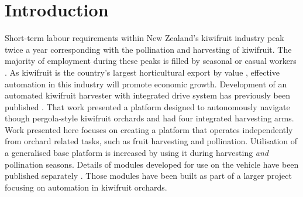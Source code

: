 \documentclass[preprint,authoryear,12pt]{elsarticle}
\begin{document}


\section{Introduction}
\label{sect:intro}
    Short-term labour requirements within New Zealand's kiwifruit industry peak twice a year corresponding with the pollination and harvesting of kiwifruit.
    The majority of employment during these peaks is filled by seasonal or casual workers \citep{Timmins2009}.
    As kiwifruit is the country's largest horticultural export by value \citep{StatisticsNewZealand2015}, effective automation in this industry will promote economic growth.
    Development of an automated kiwifruit harvester with integrated drive system has previously been published \citep{Scarfe2012}.
    That work presented a platform designed to autonomously navigate though pergola-style kiwifruit orchards and had four integrated harvesting arms.
    Work presented here focuses on creating a platform that operates independently from orchard related tasks, such as fruit harvesting and pollination.
    Utilisation of a generalised base platform is increased by using it during harvesting \emph{and} pollination seasons.
    Details of modules developed for use on the vehicle have been published separately \citep{williams2019a, williams2019b, williams2019c}.
    Those modules have been built as part of a larger project focusing on automation in kiwifruit orchards.
\end{document}
